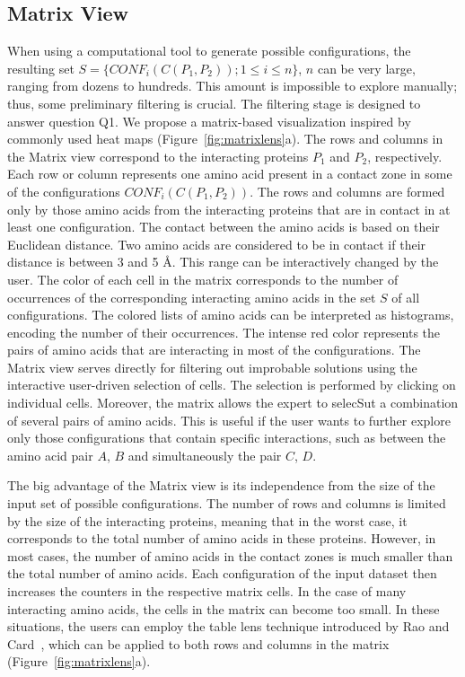 \documentclass[twocolumn]{bmcart}%
\def\MatView {Matrix view\xspace}
\begin{document}

\subsection*{Matrix View}
\label{sec:matview}
When using a computational tool to generate possible configurations, the resulting set $S = \{CONF_i(C(P_1,P_2)); 1 \leq i \leq n\}$, $n$ can be very large, ranging from dozens to hundreds. 
This amount is impossible to explore manually; thus, some preliminary filtering is crucial.
The filtering stage is designed to answer question Q1.
We propose a matrix-based visualization inspired by commonly used heat maps (Figure~\ref{fig:matrixlens}a).
The rows and columns in the \MatView correspond to the interacting proteins $P_1$ and $P_2$, respectively.
Each row or column represents one amino acid present in a contact zone in some of the configurations $CONF_i(C(P_1,P_2))$. 
The rows and columns are formed only by those amino acids from the interacting proteins that are in contact in at least one configuration.
The contact between the amino acids is based on their Euclidean distance. 
Two amino acids are considered to be in contact if their distance is between 3 and 5 \AA.
This range can be interactively changed by the user.
The color of each cell in the matrix corresponds to the number of occurrences of the corresponding interacting amino acids in the set $S$ of all configurations. 
The colored lists of amino acids can be interpreted as histograms, encoding the number of their occurrences.
The intense red color represents the pairs of amino acids that are interacting in most of the configurations.
The \MatView serves directly for filtering out improbable solutions using the interactive user-driven selection of cells.
The selection is performed by clicking on individual cells. 
Moreover, the matrix allows the expert to selecSut a combination of several pairs of amino acids.
This is useful if the user wants to further explore only those configurations that contain specific interactions, such as between the amino acid pair $A$, $B$ and simultaneously the pair $C$, $D$.  

The big advantage of the \MatView is its independence from the size of the input set of possible configurations.
The number of rows and columns is limited by the size of the interacting proteins, meaning that in the worst case, it corresponds to the total number of amino acids in these proteins.
However, in most cases, the number of amino acids in the contact zones is much smaller than the total number of amino acids.
Each configuration of the input dataset then increases the counters in the respective matrix cells.
In the case of many interacting amino acids, the cells in the matrix can become too small.
In these situations, the users can employ the table lens technique introduced by Rao and Card~\cite{Rao1994}, which can be applied to both rows and columns in the matrix (Figure~\ref{fig:matrixlens}a).
\end{document}
